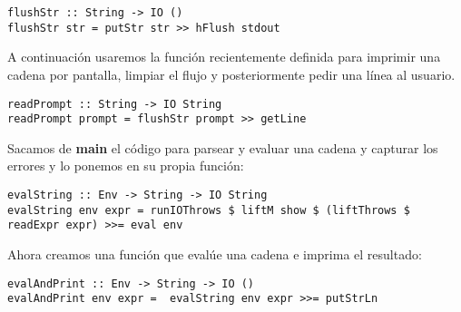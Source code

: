 \begin{minipage}{\linewidth}
\begin{footnotesize}
\begin{lstlisting}[frame=single]
flushStr :: String -> IO ()
flushStr str = putStr str >> hFlush stdout
\end{lstlisting}
\end{footnotesize}
\end{minipage}

A continuaci\'on usaremos la funci\'on recientemente definida para imprimir una cadena por pantalla, limpiar el flujo y posteriormente pedir una l\'inea al usuario.\\

\begin{minipage}{\linewidth}
\begin{footnotesize}
\begin{lstlisting}[frame=single]
readPrompt :: String -> IO String
readPrompt prompt = flushStr prompt >> getLine
\end{lstlisting}
\end{footnotesize}
\end{minipage}

Sacamos de \textbf{main} el c\'odigo para parsear y evaluar una cadena y capturar los errores y lo ponemos en su propia funci\'on:\\

\begin{minipage}{\linewidth}
\begin{tiny}
\begin{lstlisting}[frame=single]
evalString :: Env -> String -> IO String
evalString env expr = runIOThrows $ liftM show $ (liftThrows $ readExpr expr) >>= eval env
\end{lstlisting}
\end{tiny}
\end{minipage}

Ahora creamos una funci\'on que eval\'ue una cadena e imprima el resultado:\\

\begin{minipage}{\linewidth}
\begin{footnotesize}
\begin{lstlisting}[frame=single]
evalAndPrint :: Env -> String -> IO ()
evalAndPrint env expr =  evalString env expr >>= putStrLn
\end{lstlisting}
\end{footnotesize}
\end{minipage}

